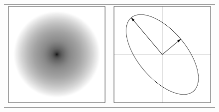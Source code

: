 \documentclass[12pt,pdftex,preprint]{aastex}
\newlength{\figurewidth}
\begin{document}
\clearpage
\begin{figure}
\setlength{\figurewidth}{0.25\textwidth}
\begin{tabular}{@{}c@{}c@{}}
\includegraphics[width=\figurewidth]{trdemo-01.pdf} &
\includegraphics[width=\figurewidth]{trdemo-02.pdf} \\

\end{tabular}
\end{figure}
\end{document}
